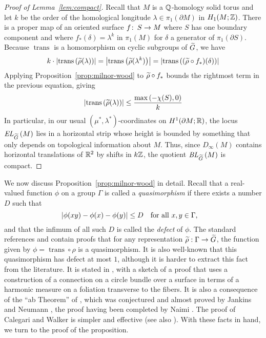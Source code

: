 \documentclass[tikz, sepfignums, defaultenums]{nmd/article}
\DeclareMathOperator{\trans}{trans}
\newcommand{\TEL}[1]{\mathit{EL}_\Gtil\left(#1\right)}
\newcommand{\SymTEL}[1]{D_\infty\left(#1\right)}
\newcommand{\TELquo}[1]{\mathit{BL}_\Gtil\left(#1\right)}
\newcommand{\abstrans}[1]{\abs{\trans\left(#1\right)}}
\begin{document}
\begin{proof}[Proof of Lemma~\ref{lem:compact}]
Recall that $M$ is a ${\mathbb Q}$-homology solid torus and let $k$ be the
order of the homological longitude $\lambda \in \pi_1(\partial M)$ in
$H_1(M;{\mathbb Z})$.  There is a proper map of an oriented surface
$f \colon\thinspace S \to M$ where $S$ has one boundary component and where
$f_*(\delta) = \lambda^k$ in $\pi_1(M)$ for $\delta$ a generator of
$\pi_1(\partial S)$.  Because $\trans$ is a homomorphism on cyclic
subgroups of $\Gtil$, we have
\[
k \cdot  \abstrans{\rhotil(\lambda)}  = \abstrans{\rhotil(\lambda^k)} 
   = \abstrans{(\rhotil \circ f_*)(\delta)}
\] 
Applying Proposition~\ref{prop:milnor-wood} to $\rhotil \circ f_*$
bounds the rightmost term in the previous equation, giving
\[
\abstrans{\rhotil(\lambda)} \leq \frac{\max\left(-\chi(S), 0\right)}{k}
\]
In particular, in our usual $(\mu^*, \lambda^*)$-coordinates on
$H^1(\partial M; {\mathbb R})$, the locus $\TEL{M}$ lies in a horizontal strip
whose height is bounded by something that only depends on topological
information about $M$.  Thus, since $\SymTEL{M}$ contains horizontal
translations of ${\mathbb R}^2$ by shifts in $k {\mathbb Z}$, the quotient $\TELquo{M}$
is compact.
\end{proof}


We now discuss Proposition~\ref{prop:milnor-wood} in detail.  Recall
that a real-valued function $\phi$ on a group $\Gamma$ is called a
\emph{quasimorphism} if there exists a number $D$ such that
\[
{\left| \phi(xy) - \phi(x) - \phi(y) \right|} \leq D  
  \quad \mbox{for all $x,y\in\Gamma$,} \quad
\]
and that the infimum of all such $D$ is
called the \emph{defect} of $\phi$.  The standard references \cite[\S
5]{Ghys2001} and \cite[\S 2.3.3]{Calegari2009} contain proofs that
for any representation $\rhotil:\Gamma\to\Gtil$, the function given by
$\phi = \trans\circ\rho$ is a quasimorphism.  It is also well-known
that this quasimorphism has defect at most $1$, although it is harder
to extract this fact from the literature.  It is stated in
\cite[Proposition~3.7]{Thurston1997}, with a sketch of a proof that
uses a construction of a connection on a circle bundle over a surface
in terms of a harmonic measure on a foliation transverse to the
fibers.  It is also a consequence of the ``ab Theorem'' of
\cite[Theorem~3.9]{CalegariWalker2011}, which was conjectured and
almost proved by Jankins and Neumann \cite{JankinsNeumann1985}, the
proof having been completed by Naimi \cite{Naimi1994}.  The proof of
Calegari and Walker is simpler and effective (see also \cite{Mann}).
With these facts in hand, we turn to the proof of the proposition.
\end{document}
